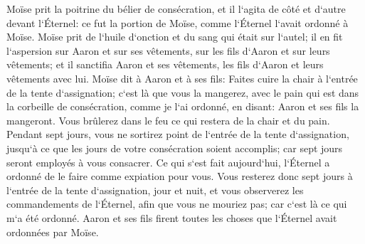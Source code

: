 \verse Moïse prit la poitrine du bélier de consécration, et il l`agita de côté et d`autre devant l`Éternel: ce fut la portion de Moïse, comme l`Éternel l`avait ordonné à Moïse. 
\verse Moïse prit de l`huile d`onction et du sang qui était sur l`autel; il en fit l`aspersion sur Aaron et sur ses vêtements, sur les fils d`Aaron et sur leurs vêtements; et il sanctifia Aaron et ses vêtements, les fils d`Aaron et leurs vêtements avec lui. 
\verse Moïse dit à Aaron et à ses fils: Faites cuire la chair à l`entrée de la tente d`assignation; c`est là que vous la mangerez, avec le pain qui est dans la corbeille de consécration, comme je l`ai ordonné, en disant: Aaron et ses fils la mangeront. 
\verse Vous brûlerez dans le feu ce qui restera de la chair et du pain. 
\verse Pendant sept jours, vous ne sortirez point de l`entrée de la tente d`assignation, jusqu`à ce que les jours de votre consécration soient accomplis; car sept jours seront employés à vous consacrer. 
\verse Ce qui s`est fait aujourd`hui, l`Éternel a ordonné de le faire comme expiation pour vous. 
\verse Vous resterez donc sept jours à l`entrée de la tente d`assignation, jour et nuit, et vous observerez les commandements de l`Éternel, afin que vous ne mouriez pas; car c`est là ce qui m`a été ordonné. 
\verse Aaron et ses fils firent toutes les choses que l`Éternel avait ordonnées par Moïse. 

